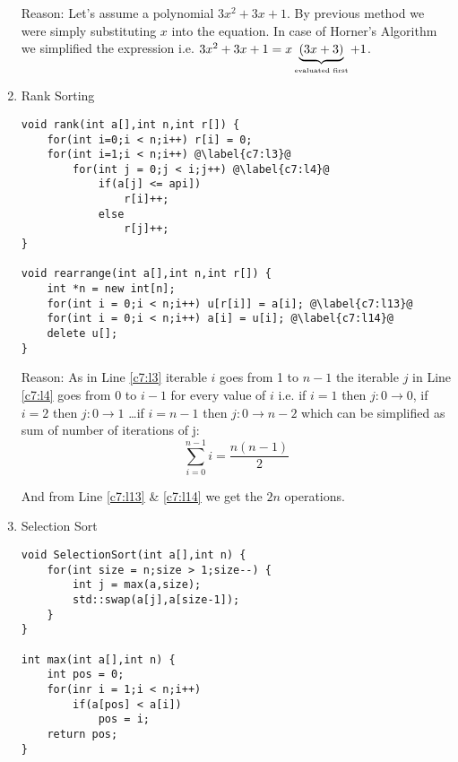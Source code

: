 \documentclass[./AlgorithmDesign.tex]{subfiles}
\begin{document}
\begin{enumerate}
\begin{mdframed}
\vspace{3mm}

Reason: 
Let's assume a polynomial $3x^2+3x+1$. By previous method we were simply substituting $x$ into the equation. In case of Horner's Algorithm we simplified the expression i.e. $3x^2+3x+1 = x \underbrace{(3x+3)}_{\textrm{\tiny{evaluated first}}}+1$.
\end{mdframed}

\item Rank Sorting
\begin{mdframed}
\begin{lstlisting}[label=c7]
void rank(int a[],int n,int r[]) {
    for(int i=0;i < n;i++) r[i] = 0;
    for(int i=1;i < n;i++) @\label{c7:l3}@ 
        for(int j = 0;j < i;j++) @\label{c7:l4}@
            if(a[j] <= api])
                r[i]++;
            else
                r[j]++;
}

void rearrange(int a[],int n,int r[]) {
    int *n = new int[n];
    for(int i = 0;i < n;i++) u[r[i]] = a[i]; @\label{c7:l13}@
    for(int i = 0;i < n;i++) a[i] = u[i]; @\label{c7:l14}@
    delete u[];
}
\end{lstlisting}

\vspace{3mm}

Reason: 
As in Line \ref{c7:l3} iterable $i$ goes from 1 to $n-1$ the iterable $j$ in Line \ref{c7:l4} goes from 0 to $i-1$ for every value of $i$ i.e. if $i=1$ then $j: 0\rightarrow0$, if $i=2$ then $j: 0\rightarrow1$ \dots if $i=n-1$ then $j:0\rightarrow n-2$ which can be simplified as sum of number of iterations of j: \[\sum_{i=0}^{n-1} i = \frac{n(n-1)}{2}\]

And from Line \ref{c7:l13} \& \ref{c7:l14} we get the $2n$ operations.
\end{mdframed}

\item  Selection Sort
\begin{mdframed}
\begin{lstlisting}[label=c8]
void SelectionSort(int a[],int n) {
    for(int size = n;size > 1;size--) {
        int j = max(a,size);
        std::swap(a[j],a[size-1]);
    }
}

int max(int a[],int n) {
    int pos = 0;
    for(inr i = 1;i < n;i++)
        if(a[pos] < a[i])
            pos = i;
    return pos;
}
\end{lstlisting}
\vspace{3mm}


\end{mdframed}
\end{enumerate}
\end{document}
